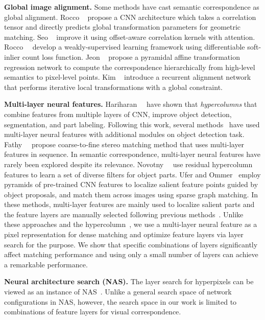 \documentclass[10pt,twocolumn,letterpaper]{article}
\begin{document}
\smallbreak
\noindent \textbf{Global image alignment.}
Some methods have cast semantic correspondence as global alignment.  
Rocco \etal~\cite{Rocco17} propose a CNN architecture which takes a correlation tensor and directly predicts global transformation parameters for geometric matching.
Seo \etal~\cite{paul2018attentive} improve it using offset-aware correlation kernels with attention.
Rocco~\etal~\cite{Rocco18} develop a weakly-supervised learning framework using differentiable soft-inlier count loss function.
Jeon \etal~\cite{jeon2018parn} propose a pyramidal affine transformation regression network to compute the correspondence hierarchically from high-level semantics to pixel-level points.
Kim \etal~\cite{NIPS2018_7851} introduce a recurrent alignment network that performs iterative local transformations with a global constraint. 

\smallbreak
\noindent \textbf{Multi-layer neural features.} 
Hariharan~\etal~\cite{hariharan2015hypercolumns} have shown that {\em hypercolumns} that combine features from multiple layers of CNN, improve object detection, segmentation, and part labeling. Following this work, several methods~\cite{kong2016hypernet, lin2017feature} have used multi-layer neural features with additional modules on object detection task.
Fathy~\etal~\cite{fathy2018hierarchical} propose coarse-to-fine stereo matching method that uses  multi-layer features in sequence. 
In semantic correspondence, multi-layer neural features have rarely been explored despite its relevance. Novotny~\etal~\cite{novotny2017anchornet} use residual hypercolumn features to learn a set of diverse filters for object parts.
Ufer and Ommer~\cite{ufer2017deep} employ pyramids of pre-trained CNN features to localize salient feature points guided by object proposals, and match them across images using sparse graph matching. In these methods, multi-layer features are mainly used to localize salient parts and the feature layers are manually selected following previous methods~\cite{girshick2015deformable, he2016deep}. 
Unlike these approaches and the hypercolumn~\cite{hariharan2015hypercolumns}, we use a multi-layer neural feature as a pixel representation for dense matching and optimize feature layers via layer search for the purpose.
We show that specific combinations of layers significantly affect matching performance and using only a small number of layers can achieve a remarkable performance. 

\smallbreak
\noindent \textbf{Neural architecture search (NAS).} 
The layer search for hyperpixels can be viewed as an instance of NAS~\cite{liu2018darts, randomwire, zoph2016neural, Zoph_2018_CVPR}. Unlike a general search space of network configurations in NAS, however, the search space in our work is limited to combinations of feature layers for visual correspondence.
\vspace{-2.0mm}
\end{document}
